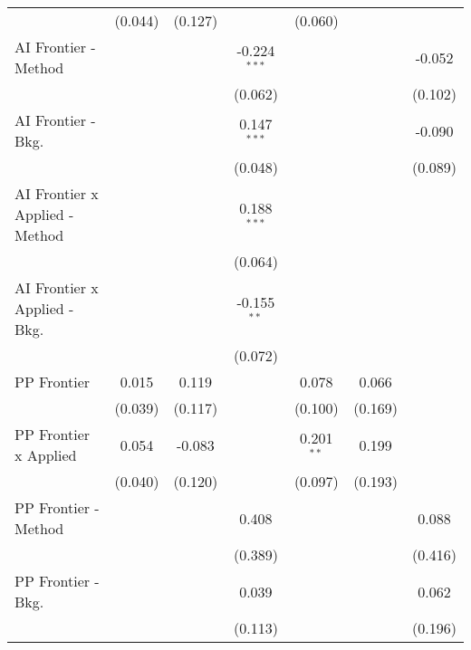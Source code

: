 \begin{tabular}{lcccccc}
                                  & (0.044)      & (0.127)       &                & (0.060)       &         &   \\   
   AI Frontier - Method           &              &               & -0.224$^{***}$ &               &         & -0.052\\   
                                  &              &               & (0.062)        &               &         & (0.102)\\   
   AI Frontier - Bkg.             &              &               & 0.147$^{***}$  &               &         & -0.090\\   
                                  &              &               & (0.048)        &               &         & (0.089)\\   
   AI Frontier x Applied - Method &              &               & 0.188$^{***}$  &               &         &   \\   
                                  &              &               & (0.064)        &               &         &   \\   
   AI Frontier x Applied - Bkg.   &              &               & -0.155$^{**}$  &               &         &   \\   
                                  &              &               & (0.072)        &               &         &   \\   
   PP Frontier                    & 0.015        & 0.119         &                & 0.078         & 0.066   &   \\   
                                  & (0.039)      & (0.117)       &                & (0.100)       & (0.169) &   \\   
   PP Frontier x Applied          & 0.054        & -0.083        &                & 0.201$^{**}$  & 0.199   &   \\   
                                  & (0.040)      & (0.120)       &                & (0.097)       & (0.193) &   \\   
   PP Frontier - Method           &              &               & 0.408          &               &         & 0.088\\   
                                  &              &               & (0.389)        &               &         & (0.416)\\   
   PP Frontier - Bkg.             &              &               & 0.039          &               &         & 0.062\\   
                                  &              &               & (0.113)        &               &         & (0.196)\\   

\end{tabular}
